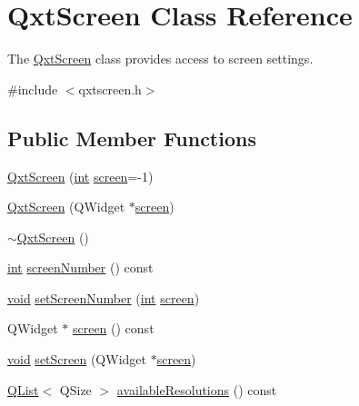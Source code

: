 \hypertarget{class_qxt_screen}{\section{Qxt\-Screen Class Reference}
\label{class_qxt_screen}
}


The \hyperlink{class_qxt_screen}{Qxt\-Screen} class provides access to screen settings.  




{\ttfamily \#include $<$qxtscreen.\-h$>$}

\subsection*{Public Member Functions}
\begin{DoxyCompactItemize}
\item 
\hyperlink{class_qxt_screen_a75353da8b17753f118ce7bfedca213f6}{Qxt\-Screen} (\hyperlink{ioapi_8h_a787fa3cf048117ba7123753c1e74fcd6}{int} \hyperlink{class_qxt_screen_a57444218ba2e18f14cc6d3a6ad44d311}{screen}=-\/1)
\item 
\hyperlink{class_qxt_screen_a142e126b541c7292c8b16e1a55885d1e}{Qxt\-Screen} (Q\-Widget $\ast$\hyperlink{class_qxt_screen_a57444218ba2e18f14cc6d3a6ad44d311}{screen})
\item 
\hyperlink{class_qxt_screen_aaa3c554fee889d41f4e630c764f8a7d2}{$\sim$\-Qxt\-Screen} ()
\item 
\hyperlink{ioapi_8h_a787fa3cf048117ba7123753c1e74fcd6}{int} \hyperlink{class_qxt_screen_a55bf93cc38c5516a2b58921b6c48ba5f}{screen\-Number} () const 
\item 
\hyperlink{group___u_a_v_objects_plugin_ga444cf2ff3f0ecbe028adce838d373f5c}{void} \hyperlink{class_qxt_screen_a96930c967b14eea9919c4b1c4cf79339}{set\-Screen\-Number} (\hyperlink{ioapi_8h_a787fa3cf048117ba7123753c1e74fcd6}{int} \hyperlink{class_qxt_screen_a57444218ba2e18f14cc6d3a6ad44d311}{screen})
\item 
Q\-Widget $\ast$ \hyperlink{class_qxt_screen_a57444218ba2e18f14cc6d3a6ad44d311}{screen} () const 
\item 
\hyperlink{group___u_a_v_objects_plugin_ga444cf2ff3f0ecbe028adce838d373f5c}{void} \hyperlink{class_qxt_screen_aeea581eb3ac5b79e29f1f0afd41d0ab8}{set\-Screen} (Q\-Widget $\ast$\hyperlink{class_qxt_screen_a57444218ba2e18f14cc6d3a6ad44d311}{screen})
\item 
\hyperlink{class_q_list}{Q\-List}$<$ Q\-Size $>$ \hyperlink{class_qxt_screen_a41d3db0d589cae24f62083684499e3e0}{available\-Resolutions} () const 

\end{DoxyCompactItemize}
